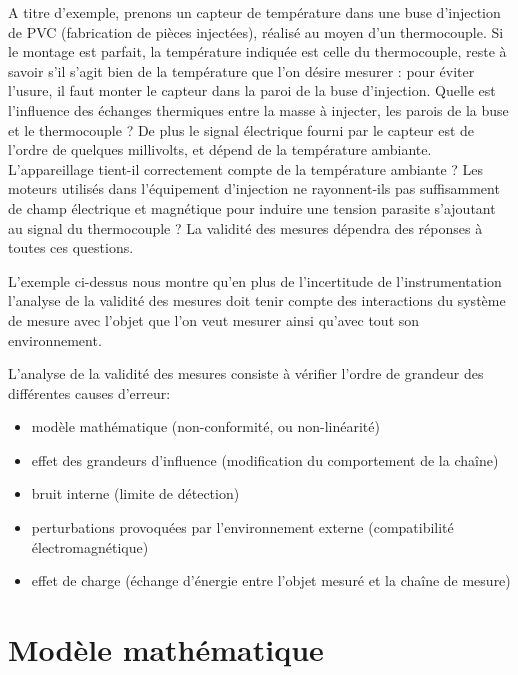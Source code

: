 A titre d'exemple, prenons un capteur de température dans une buse d'injection de PVC (fabrication de pièces injectées), réalisé au moyen d'un thermocouple. Si le montage est parfait, la température indiquée est celle du thermocouple, reste à savoir s'il s'agit bien de la température que l'on désire mesurer : pour éviter l'usure, il faut monter le capteur dans la paroi de la buse d'injection. Quelle est l'influence des échanges thermiques entre la masse à injecter, les parois de la buse et le thermocouple ? De plus le signal électrique fourni par le capteur est de l'ordre de quelques millivolts, et dépend de la température ambiante. L'appareillage tient-il correctement compte de la température ambiante ?  Les moteurs utilisés dans l'équipement d'injection ne rayonnent-ils pas suffisamment de champ électrique et magnétique pour induire une tension parasite s'ajoutant au signal du thermocouple ? La validité des mesures dépendra des réponses à toutes ces questions.

L'exemple ci-dessus nous montre qu'en plus de l'incertitude de l'instrumentation l'analyse de la validité des mesures doit tenir compte des interactions du système de mesure avec l'objet que l'on veut mesurer ainsi qu'avec tout son environnement.

\newpage
L'analyse de la validité des mesures consiste à vérifier l'ordre de grandeur des différentes causes d'erreur:
\begin{itemize}\itemsep1pt
\renewcommand{\labelitemi}{$\bullet$}
\item modèle mathématique (non-conformité, ou non-linéarité)
\item effet des grandeurs d'influence (modification du comportement de la chaîne)
\item bruit interne (limite de détection)
\item perturbations provoquées par l'environnement externe (compatibilité électromagnétique)
\item effet de charge (échange d'énergie entre l'objet mesuré et la chaîne de mesure)
\end{itemize}

\section{Modèle mathématique}

